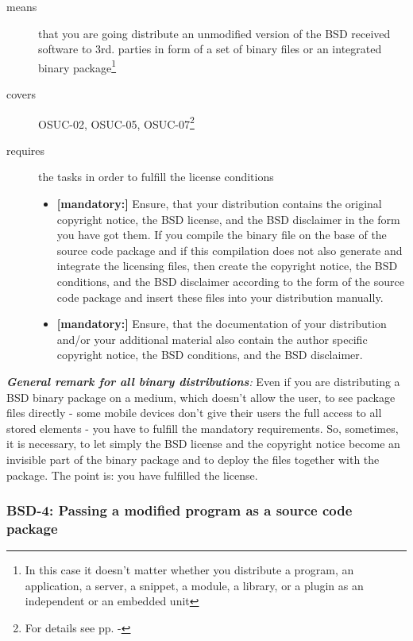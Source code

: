 \begin{description}
\item[means] that you are going distribute an unmodified version of the BSD
received software to 3rd. parties in form of a set of binary files or an
integrated bi\-na\-ry package\footnote{In this case it doesn't matter whether
you distribute a program, an application, a server, a snippet, a module, a library,
or a plugin as an independent or an embedded unit}
\item[covers] OSUC-02, OSUC-05, OSUC-07\footnote{For details see pp.
\pageref{OSUC-02-DEF} - \pageref{OSUC-07-DEF}}
\item[requires] the tasks in order to fulfill the license conditions
\begin{itemize}
  \item  \textbf{[mandatory:]} Ensure, that your distribution contains the
  original copyright notice, the BSD license, and the BSD disclaimer in the form
  you have got them. If you compile the binary file on the base of the source
  code package and if this compilation does not also generate and integrate the
  licensing files, then create the copyright notice, the BSD conditions, and the
  BSD disclaimer according to the form of the source code package and insert
  these files into your distribution manually.
  \item  \textbf{[mandatory:]} Ensure, that the documentation of your
  distribution and/or your additional material also contain the author specific
  copyright notice, the BSD conditions, and the BSD disclaimer.
\end{itemize}
\end{description}

\begin{itshape}
\emph{\textbf{General remark for all binary distributions}:} 
\label{MobileDeviceHint} Even if you are distributing a BSD bi\-na\-ry package
on a medium, which doesn't allow the user, to see package files directly - some
mobile devices don't give their users the full access to all stored elements -
you have to fulfill the mandatory requirements. So, sometimes, it is necessary,
to let simply the BSD license and the copyright notice become an invisible part
of the binary package and to deploy the files together with the package. The
point is: you have fulfilled the license.
\end{itshape}

\subsubsection{BSD-4: Passing a modified program as a source code package}
\label{OSUC-04-BSD}

